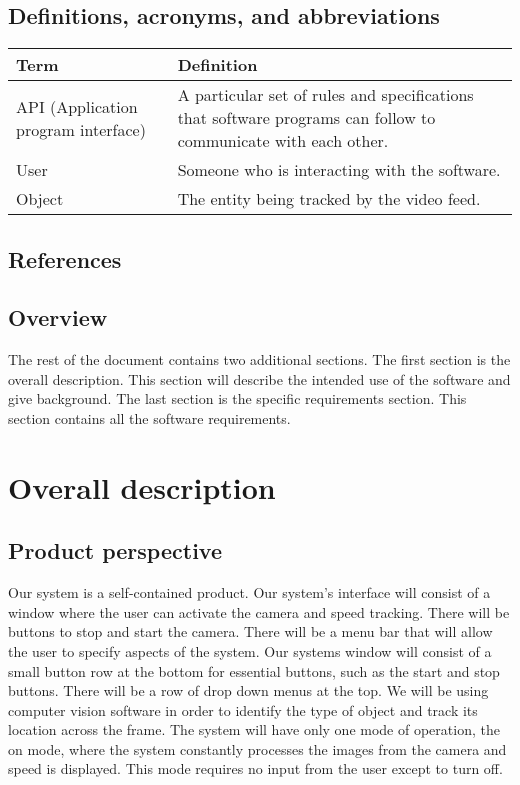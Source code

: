 \documentclass[letterpaper,10pt,onecolumn,draftclsnofoot]{IEEEtran}
\begin{document}
\subsection{Definitions, acronyms, and abbreviations}
\begin{tabular}{|p{4cm}|p{12cm}|}
	\hline
	\textbf{Term} & \textbf{Definition} \\
	\hline
	API (Application program interface) & A particular set of rules and specifications that software programs can follow to communicate with each other. \\
	\hline
	User & Someone who is interacting with the software. \\
	\hline
	Object & The entity being tracked by the video feed.  \\
	\hline
	
\end{tabular}

\subsection{References}

\subsection{Overview}
The rest of the document contains two additional sections.
The first section is the overall description.
This section will describe the intended use of the software and give background.
The last section is the specific requirements section.
This section contains all the software requirements.

\section{Overall description}
\subsection{Product perspective}
Our system is a self-contained product. 
Our system's interface will consist of a window where the user can activate the camera and speed tracking.
There will be buttons to stop and start the camera. 
There will be a menu bar that will allow the user to specify aspects of the system.
Our systems window will consist of a small button row at the bottom for essential buttons, such as the start and stop buttons.
There will be a row of drop down menus at the top.
We will be using computer vision software in order to identify the type of object and track its location across the frame.
The system will have only one mode of operation, the on mode, where the system constantly processes the images from the camera and speed is displayed.
This mode requires no input from the user except to turn off.
\end{document}
